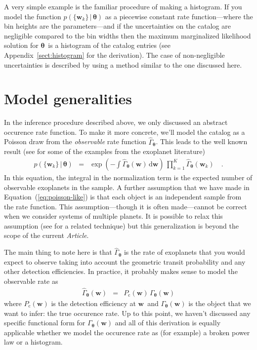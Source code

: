 \documentclass[12pt,preprint]{aastex}
\newcommand{\paper}{\textsl{Article}}
\newcommand{\Eq}[1]{Equation~(\ref{eq:#1})}
\newcommand{\eq}[1]{\Eq{#1}}
\newcommand{\eqlabel}[1]{\label{eq:#1}}
\newcommand{\App}[1]{Appendix~\ref{sect:#1}}
\newcommand{\app}[1]{\App{#1}}
\newcommand{\dd}{\ensuremath{\,\mathrm{d}}}
\newcommand{\bvec}[1]{\ensuremath{\boldsymbol{#1}}}
\newcommand{\rate}{\ensuremath{\Gamma}}
\newcommand{\ratepar}{{\ensuremath{\theta}}}
\newcommand{\ratepars}{{\ensuremath{\bvec{\ratepar}}}}
\newcommand{\obs}[1]{\ensuremath{\hat{#1}}}
\newcommand{\completeness}{{\ensuremath{P_\mathrm{c}}}}
\newcommand{\entry}{{\ensuremath{\bvec{w}}}}
\begin{document}
A very simple example is the familiar procedure of making a histogram.
If you model the function $p(\{\entry_k\}\,|\,\ratepars)$ as a piecewise
constant rate function---where the bin heights are the parameters---and if the
uncertainties on the catalog are negligible compared to the bin widths then
the maximum marginalized likelihood solution for \ratepars\ is a histogram of
the catalog entries (see \app{histogram} for the derivation).
The case of non-negligible uncertainties is described by \citet{hogge} using a
method similar to the one discussed here.

\section{Model generalities}

In the inference procedure described above, we only discussed an abstract
occurence rate function.
To make it more concrete, we'll model the catalog as a Poisson draw from the
\emph{observable} rate function $\obs{\rate}_\ratepars$.
This leads to the well known result (see \citealt{tabachnik,youdin} for some
of the examples from the exoplanet literature)
\begin{eqnarray}\eqlabel{poisson-like}
p(\{\entry_k\}\,|\,\ratepars) &=&
    \exp\left(-\int \obs{\rate}_\ratepars (\entry) \dd\entry\right) \,
    \prod_{k=1}^K \obs{\rate}_\ratepars (\entry_k)\quad.
\end{eqnarray}
In this equation, the integral in the normalization term is the expected
number of observable exoplanets in the sample.
A further assumption that we have made in \eq{poisson-like} is that each
object is an independent sample from the rate function.
This assumption---though it is often made---cannot be correct when we consider
systems of multiple planets.
It is possible to relax this assumption (see \citealt{tremaine} for a related
technique) but this generalization is beyond the scope of the current \paper.

The main thing to note here is that $\obs{\rate}_\ratepars$ is the rate of
exoplanets that you would expect to observe taking into account the geometric
transit probability and any other detection efficiencies.
In practice, it probably makes sense to model the observable rate as
\begin{eqnarray}
\obs{\rate}_\ratepars(\entry) &=&
    \completeness(\entry)\,\rate_\ratepars(\entry)
\end{eqnarray}
where $\completeness(\entry)$ is the detection efficiency at \entry\ and
$\rate_\ratepars(\entry)$ is the object that we want to infer: the true
occurence rate.
Up to this point, we haven't discussed any specific functional form for
$\rate_\ratepars(\entry)$ and all of this derivation is equally applicable
whether we model the occurence rate as (for example) a broken power law or
a histogram.
\end{document}
